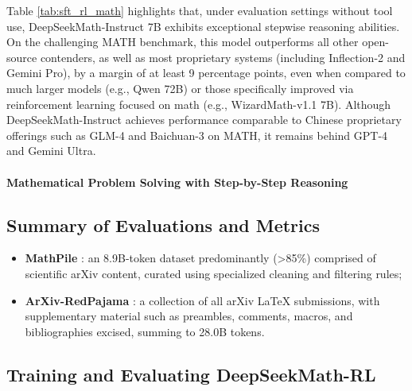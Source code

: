 \begin{itemize}[topsep=0pt]
Table \ref{tab:sft_rl_math} highlights that, under evaluation settings without tool use, DeepSeekMath-Instruct 7B exhibits exceptional stepwise reasoning abilities. On the challenging MATH benchmark, this model outperforms all other open-source contenders, as well as most proprietary systems (including Inflection-2 and Gemini Pro), by a margin of at least 9 percentage points, even when compared to much larger models (e.g., Qwen 72B) or those specifically improved via reinforcement learning focused on math (e.g., WizardMath-v1.1 7B). Although DeepSeekMath-Instruct achieves performance comparable to Chinese proprietary offerings such as GLM-4 and Baichuan-3 on MATH, it remains behind GPT-4 and Gemini Ultra.

\paragraph{Mathematical Problem Solving with Step-by-Step Reasoning}

\subsection{Summary of Evaluations and Metrics}

\begin{itemize}[topsep=0pt]
    \item \textbf{MathPile} \citep{mathpile}: an 8.9B-token dataset predominantly (>85\%) comprised of scientific arXiv content, curated using specialized cleaning and filtering rules;
    \item \textbf{ArXiv-RedPajama} \citep{redpajama}: a collection of all arXiv LaTeX submissions, with supplementary material such as preambles, comments, macros, and bibliographies excised, summing to 28.0B tokens.
\end{itemize}

\subsection{Training and Evaluating DeepSeekMath-RL}


\end{itemize}
